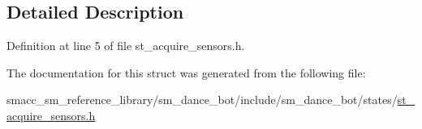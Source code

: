 \subsection{Detailed Description}


Definition at line 5 of file st\+\_\+acquire\+\_\+sensors.\+h.



The documentation for this struct was generated from the following file\+:\begin{DoxyCompactItemize}
\item 
smacc\+\_\+sm\+\_\+reference\+\_\+library/sm\+\_\+dance\+\_\+bot/include/sm\+\_\+dance\+\_\+bot/states/\hyperlink{st__acquire__sensors_8h}{st\+\_\+acquire\+\_\+sensors.\+h}\end{DoxyCompactItemize}
